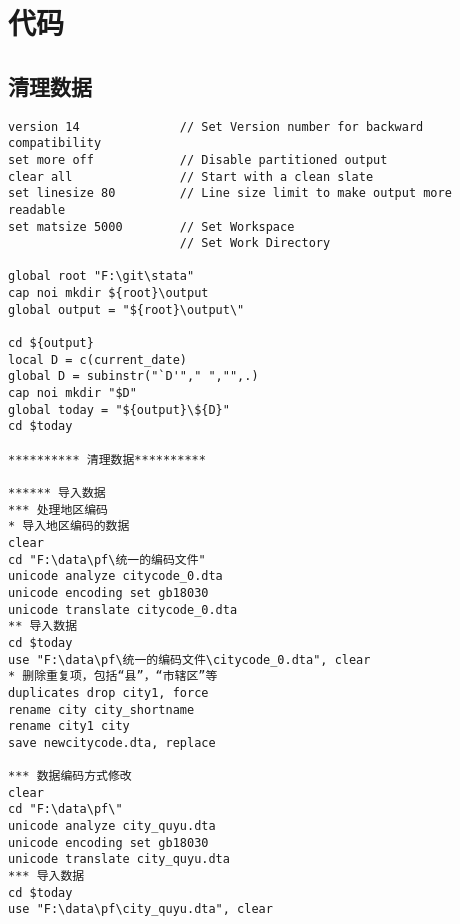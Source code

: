 \section{代码}
\subsection{清理数据}
\begin{framed}
\begin{verbatim}
version 14              // Set Version number for backward compatibility
set more off            // Disable partitioned output
clear all               // Start with a clean slate
set linesize 80         // Line size limit to make output more readable
set matsize 5000		// Set Workspace 
						// Set Work Directory

global root "F:\git\stata"
cap noi mkdir ${root}\output
global output = "${root}\output\"

cd ${output}
local D = c(current_date)
global D = subinstr("`D'"," ","",.)
cap noi mkdir "$D"
global today = "${output}\${D}"
cd $today

********** 清理数据**********

****** 导入数据
*** 处理地区编码
* 导入地区编码的数据
clear
cd "F:\data\pf\统一的编码文件"
unicode analyze citycode_0.dta
unicode encoding set gb18030
unicode translate citycode_0.dta
** 导入数据
cd $today
use "F:\data\pf\统一的编码文件\citycode_0.dta", clear
* 删除重复项，包括“县”，“市辖区”等
duplicates drop city1, force
rename city city_shortname
rename city1 city
save newcitycode.dta, replace

*** 数据编码方式修改
clear
cd "F:\data\pf\"
unicode analyze city_quyu.dta
unicode encoding set gb18030
unicode translate city_quyu.dta
*** 导入数据
cd $today
use "F:\data\pf\city_quyu.dta", clear


\end{verbatim}
\end{framed}
